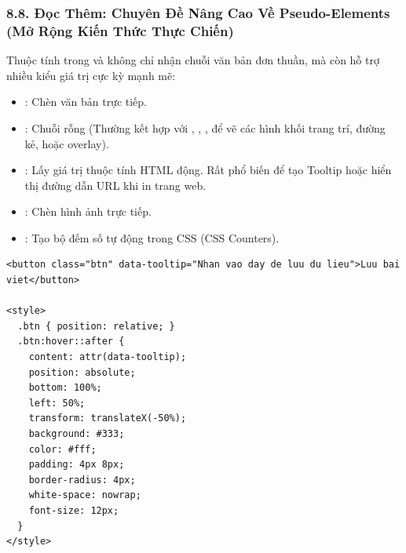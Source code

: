 \subsubsection{8.8. Đọc Thêm: Chuyên Đề Nâng Cao Về Pseudo-Elements (Mở Rộng Kiến Thức Thực Chiến)}

\begin{conceptBox}
Thuộc tính  trong  và  không chỉ nhận chuỗi văn bản đơn thuần, mà còn hỗ trợ nhiều kiểu giá trị cực kỳ mạnh mẽ:
\begin{itemize}[leftmargin=1.5em, itemsep=3pt, parsep=0pt]
    \item {}: Chèn văn bản trực tiếp.
    \item {}: Chuỗi rỗng (Thường kết hợp với , , ,  để vẽ các hình khối trang trí, đường kẻ, hoặc overlay).
    \item {}: Lấy giá trị thuộc tính HTML động. Rất phổ biến để tạo Tooltip hoặc hiển thị đường dẫn URL khi in trang web.
    \item {}: Chèn hình ảnh trực tiếp.
    \item {}: Tạo bộ đếm số tự động trong CSS (CSS Counters).
\end{itemize}
\end{conceptBox}

\begin{codeWindow}
\begin{lstlisting}[language=HTML5]
<button class="btn" data-tooltip="Nhan vao day de luu du lieu">Luu bai viet</button>

<style>
  .btn { position: relative; }
  .btn:hover::after {
    content: attr(data-tooltip);
    position: absolute;
    bottom: 100%;
    left: 50%;
    transform: translateX(-50%);
    background: #333;
    color: #fff;
    padding: 4px 8px;
    border-radius: 4px;
    white-space: nowrap;
    font-size: 12px;
  }
</style>
\end{lstlisting}
\end{codeWindow}

